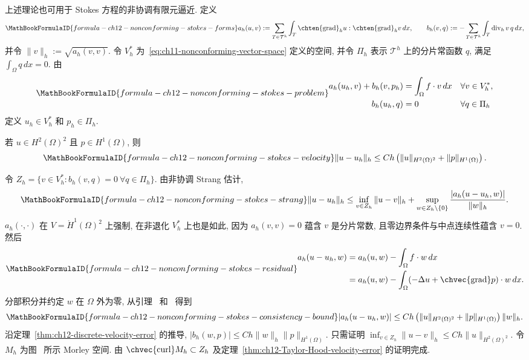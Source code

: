 上述理论也可用于 Stokes 方程的非协调有限元逼近. 定义
\[
\MathBookFormulaID{formula-ch12-nonconforming-stokes-forms}
a_h(u,v):=\sum_{T\in\mathcal T^h}\int_T
\chten{\operatorname{grad}}_h u:\chten{\operatorname{grad}}_h v\,dx,
\qquad
b_h(v,q):=-\sum_{T\in\mathcal T^h}\int_T\operatorname{div}_h v\,q\,dx,
\]
并令 $\|v\|_h:=\sqrt{a_h(v,v)}$. 令 $V_h^*$ 为~\eqref{eq:ch11-nonconforming-vector-space} 定义的空间, 并令 $\Pi_h$ 表示 $\mathcal T^h$ 上的分片常函数 $q$, 满足 $\int_\Omega q\,dx=0$. 由
\begin{equation}
\MathBookFormulaID{formula-ch12-nonconforming-stokes-problem}
\label{eq:ch12-nonconforming-stokes-problem}
\begin{aligned}
a_h(u_h,v)+b_h(v,p_h)&=\int_\Omega f\cdot v\,dx&&\forall v\in V_h^*,\\
b_h(u_h,q)&=0&&\forall q\in\Pi_h
\end{aligned}
\end{equation}
定义 $u_h\in V_h^*$ 和 $p_h\in\Pi_h$.

\begin{Theorem}
\label{thm:ch12-nonconforming-stokes-velocity}
若 $u\in H^2(\Omega)^2$ 且 $p\in H^1(\Omega)$, 则
\[
\MathBookFormulaID{formula-ch12-nonconforming-stokes-velocity}
\|u-u_h\|_h\leq Ch\left(\|u\|_{H^2(\Omega)^2}
+\|p\|_{H^1(\Omega)}\right).
\]
\end{Theorem}

\begin{Proof}
令 $Z_h=\{v\in V_h^*:b_h(v,q)=0\ \forall q\in\Pi_h\}$. 由非协调 Strang 估计,
\[
\MathBookFormulaID{formula-ch12-nonconforming-stokes-strang}
\|u-u_h\|_h\leq\inf_{v\in Z_h}\|u-v\|_h+
\sup_{w\in Z_h\setminus\{0\}}
\frac{|a_h(u-u_h,w)|}{\|w\|_h}.
\]
$a_h(\cdot,\cdot)$ 在 $V=\mathring H^1(\Omega)^2$ 上强制, 在非退化 $V_h^*$ 上也是如此, 因为 $a_h(v,v)=0$ 蕴含 $v$ 是分片常数, 且零边界条件与中点连续性蕴含 $v=0$. 然后
\[
\MathBookFormulaID{formula-ch12-nonconforming-stokes-residual}
\begin{aligned}
a_h(u-u_h,w)
&=a_h(u,w)-\int_\Omega f\cdot w\,dx\\
&=a_h(u,w)-\int_\Omega(-\Delta u+\chvec{\operatorname{grad}}p)\cdot w\,dx.
\end{aligned}
\]
分部积分并约定 $w$ 在 $\Omega$ 外为零, 从引理~ 和~ 得到
\[
\MathBookFormulaID{formula-ch12-nonconforming-stokes-consistency-bound}
|a_h(u-u_h,w)|
\leq Ch\left(\|u\|_{H^2(\Omega)^2}+\|p\|_{H^1(\Omega)}\right)\|w\|_h.
\]
沿定理~\ref{thm:ch12-discrete-velocity-error} 的推导,
$|b_h(w,p)|\leq Ch\|w\|_h\|p\|_{H^1(\Omega)}$. 只需证明
$\inf_{v\in Z_h}\|u-v\|_h\leq Ch\|u\|_{H^2(\Omega)^2}$. 令 $M_h$ 为图~ 所示 Morley 空间. 由 $\chvec{\operatorname{curl}}M_h\subset Z_h$ 及定理~\ref{thm:ch12-Taylor-Hood-velocity-error} 的证明完成.
\end{Proof}
